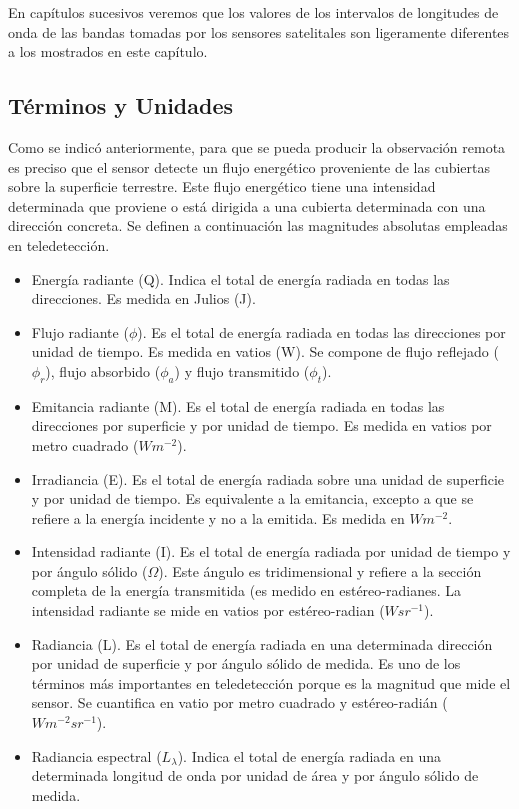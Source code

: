 En capítulos sucesivos veremos que los valores de los intervalos de longitudes de onda de las bandas tomadas por los sensores satelitales son ligeramente diferentes a los mostrados en este capítulo.

\subsection{Términos y Unidades}
Como se indicó anteriormente, para que se pueda producir la observación remota es preciso que el sensor detecte un flujo energético proveniente de las cubiertas sobre la superficie terrestre. Este flujo energético tiene una intensidad determinada que proviene o está dirigida a una cubierta determinada con una dirección concreta. Se definen a continuación las magnitudes absolutas empleadas en teledetección.

\begin{itemize}
	\item Energía radiante (Q). Indica el total de energía radiada en todas las direcciones. Es medida en Julios (J).
	\item Flujo radiante ($\phi$). Es el total de energía radiada en todas las direcciones por unidad de tiempo. Es medida en vatios (W). Se compone de flujo reflejado ($\phi_{r}$), flujo absorbido ($\phi_{a}$) y flujo transmitido ($\phi_{t}$).
	\item Emitancia radiante (M). Es el total de energía radiada en todas las direcciones por superficie y por unidad de tiempo. Es medida en vatios por metro cuadrado ($Wm^{-2}$).
	\item Irradiancia (E). Es el total de energía radiada sobre una unidad de superficie y por unidad de tiempo. Es equivalente a la emitancia, excepto a que se refiere a la energía incidente y no a la emitida. Es medida en $Wm^{-2}$.
	\item Intensidad radiante (I). Es el total de energía radiada por unidad de tiempo y por ángulo sólido ($\Omega$). Este ángulo es tridimensional y refiere a la sección completa de la energía transmitida (es medido en estéreo-radianes. La intensidad radiante se mide en vatios por estéreo-radian ($Wsr^{-1}$).
	\item Radiancia (L). Es el total de energía radiada en una determinada dirección por unidad de superficie y por ángulo sólido de medida. Es uno de los términos más importantes en teledetección porque es la magnitud que mide el sensor. Se cuantifica en vatio por metro cuadrado y estéreo-radián ($Wm^{-2}sr^{-1}$).
	\item Radiancia espectral ($L_{\lambda}$). Indica el total de energía radiada en una determinada longitud de onda por unidad de área y por ángulo sólido de medida.
\end{itemize}

